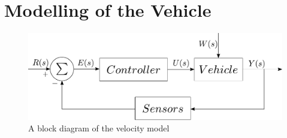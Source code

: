 \chapter{Modelling of the Vehicle}\label{cha:ModelOfVehicle}

\begin{figure}[H]
	\centering
	\includegraphics[scale=0.6]{figures/StartTotalModelsystem.pdf}
	\caption{A block diagram of the velocity model}
	\label{fig:StartTotalModelsystem}
\end{figure}

